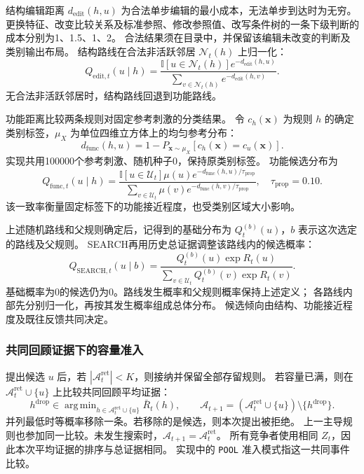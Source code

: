\documentclass[11pt,a4paper]{article}
\numberwithin{equation}{section}
\newcommand{\ind}{\mathbb{I}}
\newcommand{\A}{\mathcal{A}}
\DeclareMathOperator*{\argmin}{arg\,min}
\begin{document}
结构编辑距离 $d_{\mathrm{edit}}(h,u)$ 为合法单步编辑的最小成本，无法单步到达时为无穷。
更换特征、改变比较关系及标准参照、修改参照值、改写条件树的一条下级判断的成本分别为1、1.5、1、2。
合法结果须在目录中，并保留该编辑未改变的判断及类别输出布局。
结构路线在合法非活跃邻居 $\mathcal N_t(h)$ 上归一化：
\begin{equation}
Q_{\mathrm{edit},t}(u\mid h)=
\frac{\ind[u\in\mathcal N_t(h)]e^{-d_{\mathrm{edit}}(h,u)}}
{\sum_{v\in\mathcal N_t(h)}e^{-d_{\mathrm{edit}}(h,v)}}.
\end{equation}
无合法非活跃邻居时，结构路线回退到功能路线。

功能距离比较两条规则对固定参考刺激的分类结果。
令 $c_h(\bm x)$ 为规则 $h$ 的确定类别标签，$\mu_X$ 为单位四维立方体上的均匀参考分布：
\begin{equation}
d_{\mathrm{func}}(h,u)=1-P_{\bm x\sim\mu_X}[c_h(\bm x)=c_u(\bm x)].
\end{equation}
实现共用100000个参考刺激、随机种子0，保持原类别标签。
功能候选分布为
\begin{equation}
Q_{\mathrm{func},t}(u\mid h)=
\frac{\ind[u\in\mathcal U_t]\mu(u)e^{-d_{\mathrm{func}}(h,u)/\tau_{\mathrm{prop}}}}
{\sum_{v\in\mathcal U_t}\mu(v)e^{-d_{\mathrm{func}}(h,v)/\tau_{\mathrm{prop}}}},
\quad \tau_{\mathrm{prop}}=0.10.
\end{equation}
该一致率衡量固定标签下的功能接近程度，也受类别区域大小影响。

上述随机路线和父规则确定后，记得到的基础分布为 $Q_t^{(b)}(u)$，$b$ 表示这次选定的路线及父规则。
SEARCH再用历史总证据调整该路线内的候选概率：
\begin{equation}
Q_{\mathrm{SEARCH},t}(u\mid b)=
\frac{Q_t^{(b)}(u)\exp R_t(u)}
{\sum_{v\in\mathcal U_t}Q_t^{(b)}(v)\exp R_t(v)}.
\label{eq:search-tilt}
\end{equation}
基础概率为0的候选仍为0。路线发生概率和父规则概率保持上述定义；
各路线内部先分别归一化，再按其发生概率组成总体分布。
候选倾向由结构、功能接近程度及既往反馈共同决定。

\subsubsection{共同回顾证据下的容量准入}
\label{sec:admission}
提出候选 $u$ 后，若 $|\A_t^{\mathrm{ret}}|<K$，则接纳并保留全部存留规则。
若容量已满，则在 $\A_t^{\mathrm{ret}}\cup\{u\}$ 上比较共同回顾平均证据：
\begin{equation}
h^{\mathrm{drop}}\in\argmin_{h\in\A_t^{\mathrm{ret}}\cup\{u\}}\bar R_t(h),\qquad
\A_{t+1}=(\A_t^{\mathrm{ret}}\cup\{u\})\setminus\{h^{\mathrm{drop}}\}.
\label{eq:admission}
\end{equation}
并列最低时等概率移除一条。若移除的是候选，则本次提出被拒绝。
上一主导规则也参加同一比较。未发生搜索时，$\A_{t+1}=\A_t^{\mathrm{ret}}$。
所有竞争者使用相同 $Z_t$，因此本次平均证据的排序与总证据相同。
实现中的 \texttt{POOL} 准入模式指这一共同事件比较。
\end{document}
